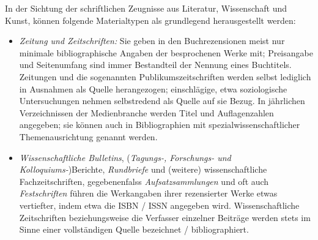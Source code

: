 \documentclass[a4paper,
fontsize=11pt,
oneside,
numbers=noperiodatend,
parskip=half-,
bibliography=totoc,
final
]{scrartcl}
\begin{document}
In der Sichtung der schriftlichen Zeugnisse aus Literatur, Wissenschaft
und Kunst, können folgende Materialtypen als grundlegend herausgestellt
werden:

\begin{itemize}
\item
  \emph{Zeitung und Zeitschriften:} Sie geben in den Buchrezensionen
  meist nur minimale bibliographische Angaben der besprochenen Werke
  mit; Preisangabe und Seitenumfang sind immer Bestandteil der Nennung
  eines Buchtitels. Zeitungen und die sogenannten Publikumszeitschriften
  werden selbst lediglich in Ausnahmen als Quelle herangezogen;
  einschlägige, etwa soziologische Untersuchungen nehmen selbstredend
  als Quelle auf sie Bezug. In jährlichen Verzeichnissen der
  Medienbranche werden Titel und Auflagenzahlen angegeben; sie können
  auch in Bibliographien mit spezialwissenschaftlicher Themenausrichtung
  genannt werden.
\item
  \emph{Wissenschaftliche Bulletins}, (\emph{Tagungs-, Forschungs- und
  Kolloquiums-})Berichte, \emph{Rundbriefe} und (weitere)
  wissenschaftliche Fachzeitschriften, gegebenenfalss
  \emph{Aufsatzsammlungen} und oft auch \emph{Festschriften} führen die
  Werkangaben ihrer rezensierter Werke etwas vertiefter, indem etwa die
  ISBN / ISSN angegeben wird. Wissenschaftliche Zeitschriften
  beziehungsweise die Verfasser einzelner Beiträge werden stets im Sinne
  einer vollständigen Quelle bezeichnet / bibliographiert.
\end{itemize}
\end{document}
